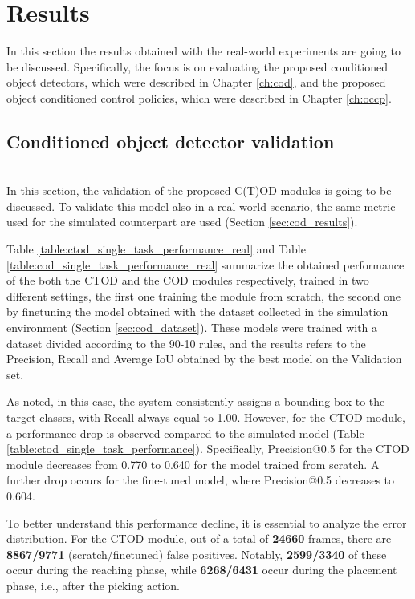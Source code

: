 \section{Results}
\label{sec:real_results}
In this section the results obtained with the real-world experiments are going to be discussed.
Specifically, the focus is on evaluating the proposed conditioned object detectors, which were described in Chapter \ref{ch:cod}, and the proposed object conditioned control policies, which were described in Chapter \ref{ch:occp}.

\subsection{Conditioned object detector validation}\mbox{}\\
In this section, the validation of the proposed C(T)OD modules is going to be discussed. To validate this model also in a real-world scenario, the same metric used for the simulated counterpart are used (Section \ref{sec:cod_results}). 

Table \ref{table:ctod_single_task_performance_real} and Table \ref{table:cod_single_task_performance_real} summarize the obtained performance of the both the CTOD and the COD modules respectively, trained in two different settings, the first one training the module from scratch, the second one by finetuning the model obtained with the dataset collected in the simulation environment (Section \ref{sec:cod_dataset}). These models were trained with a dataset divided according to the 90-10 rules, and the results refers to the Precision, Recall and Average IoU obtained by the best model on the Validation set.




As noted, in this case, the system consistently assigns a bounding box to the target classes, with Recall always equal to 1.00. However, for the CTOD module, a performance drop is observed compared to the simulated model (Table \ref{table:ctod_single_task_performance}). Specifically, Precision@0.5 for the CTOD module decreases from 0.770 to 0.640 for the model trained from scratch. A further drop occurs for the fine-tuned model, where Precision@0.5 decreases to 0.604.

To better understand this performance decline, it is essential to analyze the error distribution. For the CTOD module, out of a total of \textbf{24660} frames, there are \textbf{8867/9771} (scratch/finetuned) false positives. Notably, \textbf{2599/3340} of these occur during the reaching phase, while \textbf{6268/6431} occur during the placement phase, i.e., after the picking action.

